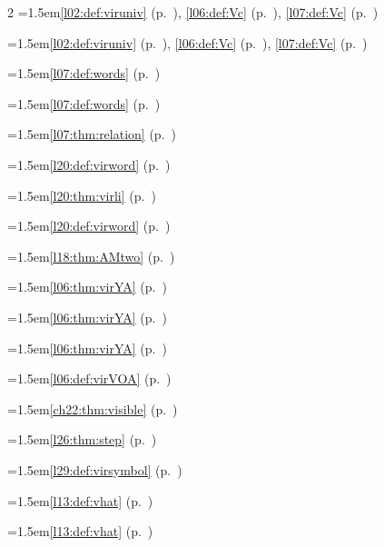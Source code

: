 \begin{multicols}{2}
\hangindent=1.5em\quad \ref{l02:def:viruniv} (p.~\pageref{l02:def:viruniv}), \ref{l06:def:Vc} (p.~\pageref{l06:def:Vc}), \ref{l07:def:Vc} (p.~\pageref{l07:def:Vc})\par
\hangindent=1.5em\quad \ref{l02:def:viruniv} (p.~\pageref{l02:def:viruniv}), \ref{l06:def:Vc} (p.~\pageref{l06:def:Vc}), \ref{l07:def:Vc} (p.~\pageref{l07:def:Vc})\par
\hangindent=1.5em\quad \ref{l07:def:words} (p.~\pageref{l07:def:words})\par
\hangindent=1.5em\quad \ref{l07:def:words} (p.~\pageref{l07:def:words})\par
\hangindent=1.5em\quad \ref{l07:thm:relation} (p.~\pageref{l07:thm:relation})\par
\hangindent=1.5em\quad \ref{l20:def:virword} (p.~\pageref{l20:def:virword})\par
\hangindent=1.5em\quad \ref{l20:thm:virli} (p.~\pageref{l20:thm:virli})\par
\hangindent=1.5em\quad \ref{l20:def:virword} (p.~\pageref{l20:def:virword})\par
\hangindent=1.5em\quad \ref{l18:thm:AMtwo} (p.~\pageref{l18:thm:AMtwo})\par
\hangindent=1.5em\quad \ref{l06:thm:virYA} (p.~\pageref{l06:thm:virYA})\par
\hangindent=1.5em\quad \ref{l06:thm:virYA} (p.~\pageref{l06:thm:virYA})\par
\hangindent=1.5em\quad \ref{l06:thm:virYA} (p.~\pageref{l06:thm:virYA})\par
\hangindent=1.5em\quad \ref{l06:def:virVOA} (p.~\pageref{l06:def:virVOA})\par
\hangindent=1.5em\quad \ref{ch22:thm:visible} (p.~\pageref{ch22:thm:visible})\par
\hangindent=1.5em\quad \ref{l26:thm:step} (p.~\pageref{l26:thm:step})\par
\hangindent=1.5em\quad \ref{l29:def:virsymbol} (p.~\pageref{l29:def:virsymbol})\par
\hangindent=1.5em\quad \ref{l13:def:vhat} (p.~\pageref{l13:def:vhat})\par
\hangindent=1.5em\quad \ref{l13:def:vhat} (p.~\pageref{l13:def:vhat})\par

\end{multicols}

